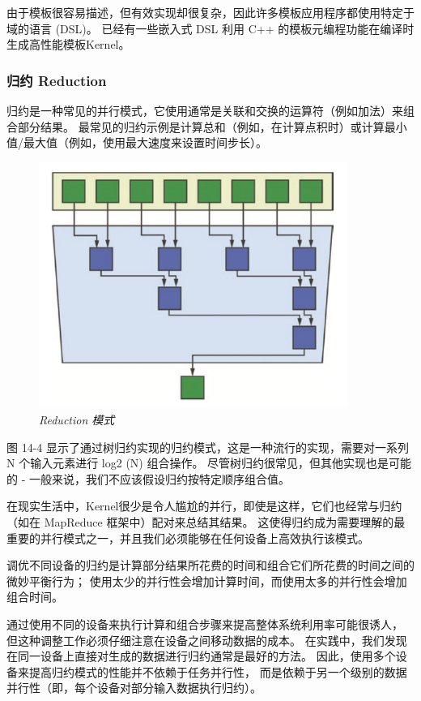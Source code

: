 由于模板很容易描述，但有效实现却很复杂，因此许多模板应用程序都使用特定于域的语言 (DSL)。 
已经有一些嵌入式 DSL 利用 C++ 的模板元编程功能在编译时生成高性能模板Kernel。

\subsubsection{归约 Reduction}
归约是一种常见的并行模式，它使用通常是关联和交换的运算符（例如加法）来组合部分结果。 
最常见的归约示例是计算总和（例如，在计算点积时）或计算最小值/最大值（例如，使用最大速度来设置时间步长）。

\begin{figure}[H]
	\centering
	\includegraphics[width=0.9\textwidth]{figs/F14.4.png}
	\caption{\textit{Reduction 模式 }}
\end{figure}

图 14-4 显示了通过树归约实现的归约模式，这是一种流行的实现，需要对一系列 N 个输入元素进行 log2 (N) 组合操作。 
尽管树归约很常见，但其他实现也是可能的 - 一般来说，我们不应该假设归约按特定顺序组合值。

在现实生活中，Kernel很少是令人尴尬的并行，即使是这样，它们也经常与归约（如在 MapReduce 框架中）配对来总结其结果。 
这使得归约成为需要理解的最重要的并行模式之一，并且我们必须能够在任何设备上高效执行该模式。

调优不同设备的归约是计算部分结果所花费的时间和组合它们所花费的时间之间的微妙平衡行为； 
使用太少的并行性会增加计算时间，而使用太多的并行性会增加组合时间。

通过使用不同的设备来执行计算和组合步骤来提高整体系统利用率可能很诱人，
但这种调整工作必须仔细注意在设备之间移动数据的成本。 
在实践中，我们发现在同一设备上直接对生成的数据进行归约通常是最好的方法。 
因此，使用多个设备来提高归约模式的性能并不依赖于任务并行性，
而是依赖于另一个级别的数据并行性（即，每个设备对部分输入数据执行归约）。

